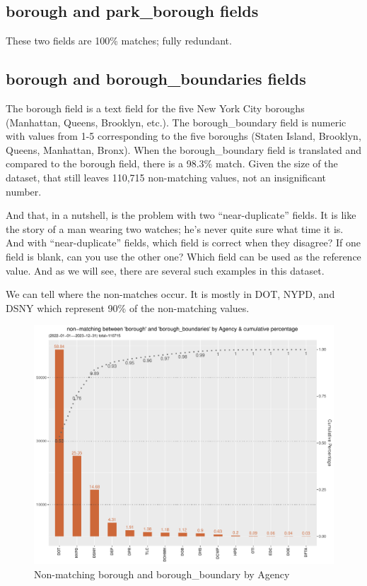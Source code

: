\documentclass[12pt, titlepage]{article}
\begin{document}
{\subsection{borough and park\_borough fields}  These two fields are 100\% matches; fully redundant.

\subsection{borough and borough\_boundaries fields}  The borough field is a text field for the five New York City boroughs (Manhattan, Queens, Brooklyn, etc.).
The borough\_boundary field is numeric with values from 1-5 corresponding to the five boroughs (Staten Island, Brooklyn, Queens, Manhattan, Bronx).
When the borough\_boundary field is translated and compared to the borough field, there is a 98.3\% match. Given the size of the dataset, that 
still leaves 110,715 non-matching values, not an insignificant number.  

And that, in a nutshell, is the problem with two ``near-duplicate'' fields. It is like the  story of a man wearing two watches; he's never
quite sure what time it is. And with ``near-duplicate'' fields, which field is correct when they disagree? 
If one field is blank, can you use the other one? Which field can be used as the reference value.
 And as we will see, there are several such examples in this dataset.

We can tell where the non-matches occur. It is mostly in DOT, NYPD, and DSNY which represent 90\% of the non-matching values.

	\begin{figure}[H]
		 \centering
		 \includegraphics[width = \textwidth]{non_matching_borough_boundaries_chart.pdf}
		 \caption{Non-matching borough and borough\_boundary by Agency }
		 \label{fig:borough-boundaries}
	\end{figure}	
	
}
\end{document}
